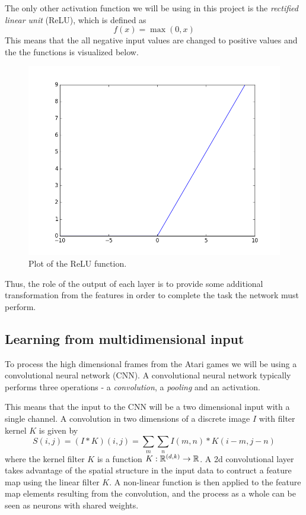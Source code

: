 \documentclass[11pt]{article}
\begin{document}
The only other activation function we will be using in this project
is the \textit{rectified linear unit} (ReLU), which is defined as
\begin{equation}
    f(x) = \max(0,x)
\end{equation}
This means that the all negative input values are changed to positive
values and the the functions is visualized below.

\begin{figure}[!h]
    \centering
    \includegraphics[width=15cm]{include/relu.png}
    \caption{Plot of the ReLU function.}
    \label{fig:relu}
\end{figure}
Thus, the role of the output of each layer is to provide some additional
transformation from the features in order to complete the task the network
must perform\cite{DeepLearningBook}.

\subsection{Learning from multidimensional input}

To process the high dimensional frames from the Atari games we will be using
a convolutional neural network (CNN).
A convolutional neural network typically performs three operations - a \textit{convolution},
a \textit{pooling} and an activation.

This means that the input to the CNN will be a two dimensional input with a single
channel. A convolution in two dimensions of a discrete image $I$ with filter kernel $K$
is given by 
\begin{equation}
    S(i, j) = (I \ast K)(i, j) = \sum\limits_m \sum\limits_n I(m, n) * K(i - m, j - n)
\end{equation}
where the kernel filter $K$ is a function $K : \mathbb{R}^{(d, k)} \to \mathbb{R}$.
A 2d convolutional layer takes advantage of the spatial structure in the input data to contruct a feature map
using the linear filter $K$.
A non-linear function is then applied to the feature map elements resulting from the convolution,
and the process as a whole can be seen as neurons with shared weights\cite{IgelConv}.
\end{document}
